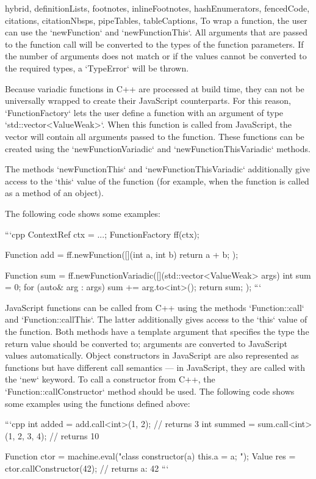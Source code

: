 \begin{markdown*}{%
  hybrid,
  definitionLists,
  footnotes,
  inlineFootnotes,
  hashEnumerators,
  fencedCode,
  citations,
  citationNbsps,
  pipeTables,
  tableCaptions,
}
To wrap a function, the user can use the `newFunction` and `newFunctionThis`. All arguments that are passed to the function call will be converted to the types of the function parameters. If the number of arguments does not match or if the values cannot be converted to the required types, a `TypeError` will be thrown.

Because variadic functions in C++ are processed at build time, they can not be universally wrapped to create their JavaScript counterparts. For this reason, `FunctionFactory` lets the user define a function with an argument of type `std::vector<ValueWeak>`. When this function is called from JavaScript, the vector will contain all arguments passed to the function. These functions can be created using the `newFunctionVariadic` and `newFunctionThisVariadic` methods.

The methods `newFunctionThis` and `newFunctionThisVariadic` additionally give access to the `this` value of the function (for example, when the function is called as a method of an object).

The following code shows some examples:

```cpp
ContextRef ctx = ...;
FunctionFactory ff(ctx);

Function add = ff.newFunction([](int a, int b) { return a + b; });

Function sum = ff.newFunctionVariadic([](std::vector<ValueWeak> args) {
  int sum = 0;
  for (auto& arg : args) {
    sum += arg.to<int>();
  }
  return sum;
});
```

JavaScript functions can be called from C++ using the methods `Function::call` and `Function::callThis`. The latter additionally gives access to the `this` value of the function. Both methods have a template argument that specifies the type the return value should be converted to; arguments are converted to JavaScript values automatically. Object constructors in JavaScript are also represented as functions but have different call semantics --- in JavaScript, they are called with the `new` keyword. To call a constructor from C++, the `Function::callConstructor` method should be used. The following code shows some examples using the functions defined above:

```cpp
int added = add.call<int>(1, 2);  // returns 3
int summed = sum.call<int>(1, 2, 3, 4);  // returns 10

Function ctor = machine.eval("class { constructor(a) { this.a = a; } }");
Value res = ctor.callConstructor(42);  // returns { a: 42 }
```



\end{markdown*}
